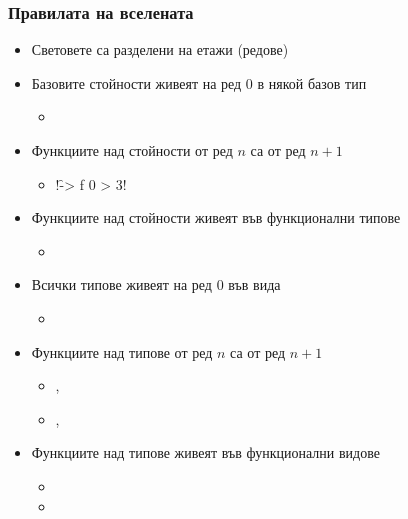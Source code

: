 \documentclass[alsotrans]{beamerswitch}
\begin{document}
\begin{frame}[fragile]
  \frametitle{Правилата на вселената}
  \begin{itemize}[<+->]
    \small
  \item Световете са разделени на етажи (редове)
  \item Базовите стойности живеят на ред 0 в някой базов тип
    \begin{itemize}
    \item {}
    \end{itemize}
  \item Функциите над стойности от ред $n$ са от ред $n+1$
    \begin{itemize}
    \item \lst!\f -> f 0 > 3!
    \end{itemize}
  \item Функциите над стойности живеят във функционални типове
    \begin{itemize}
    \item {}
    \end{itemize}
  \item Всички типове живеят на ред 0 във вида \lst{*}
    \begin{itemize}
    \item {}
    \end{itemize}
  \item Функциите над типове от ред $n$ са от ред $n+1$
    \begin{itemize}
    \item \lst{[]}, 
    \item {}, 
    \end{itemize}
  \item Функциите над типове живеят във функционални видове
    \begin{itemize}
    \item {}
    \item {}
    \end{itemize}
  \end{itemize}
\end{frame}
\end{document}
